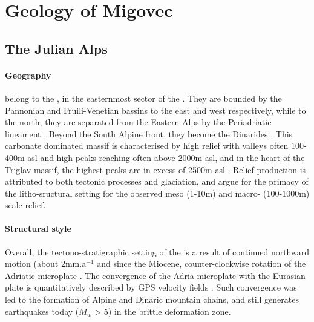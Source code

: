 


\section{Geology of Migovec}

\subsection{The Julian Alps}
\label{sec:The Julian Alps}

\paragraph{Geography} 
\label{par:Geography} 
 belong to the , in the easternmost sector of the  \citep{bavec2004late}. 
They are bounded by the Pannonian and  Fruili-Venetian bassins to the east and west respectively, while to the north, they are separated from the Eastern Alps by the Periadriatic lineament . Beyond the South Alpine front, they become the Dinarides \citep{placer1998contribution,burrato2008sources}.
This carbonate dominated massif is characterised by high relief with valleys often 100-400m asl and high peaks reaching often above 2000m asl, and in the heart of the Triglav massif, the highest peaks are in excess of 2500m asl  \citep{vsmuc2009tectonic}. Relief production is attributed to both tectonic processes and glaciation, and \citet{vsmuc2009tectonic} argue for the primacy of the litho-sructural setting for the observed meso (1-10m) and macro- (100-1000m) scale relief.


\paragraph{Structural style}
\label{par:Structural style}
Overall, the tectono-stratigraphic setting  of the  is a result of continued northward motion (about 2mm.a$^{-1}$ \citep{burrato2008sources} and since the Miocene,  counter-clockwise rotation of the Adriatic microplate \citep{marton2003palaeomagnetic}. 
The convergence of the Adria microplate with the Eurasian plate is quantitatively described by GPS velocity fields \citep{grenerczy2005tectonic}. 
Such convergence was led to the formation of Alpine and Dinaric mountain chains, and still generates earthquakes today ($M_w$ > 5) in the brittle deformation zone.

